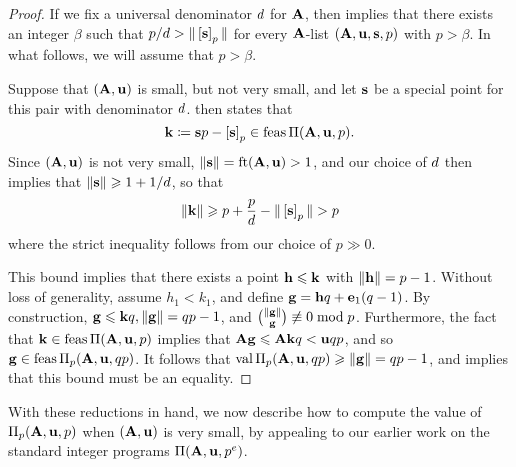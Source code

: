 \documentclass{amsart}
\begin{document}
\begin{proof}
   If we fix a universal denominator $d$ for $\mathbf{A}$, then  implies that there exists an integer $\beta$ such that $p/d > \| \left[ \mathbf{s} \right]_p \|$ for every $\mathbf{A}$-list $(\mathbf{A},\mathbf{u},\mathbf{s}, p)$ with $p > \beta$.
   In what follows, we will assume that $p > \beta$.

   Suppose that $(\mathbf{A},\mathbf{u})$ is small, but not very small, and let $\mathbf{s}$ be a special point for this pair with denominator $d$.
    then states that
   \[ \mathbf{k} \coloneqq \mathbf{s}p-\left[ \mathbf{s} \right]_p \in \operatorname{feas} \Pi(\mathbf{A},\mathbf{u},p). \]
   Since $(\mathbf{A},\mathbf{u})$ is not very small, $\| \mathbf{s} \| = \operatorname{ft}(\mathbf{A}, \mathbf{u}) > 1$, and our choice of $d$ then implies that $\| \mathbf{s} \| \geqslant 1 + 1/d$, so that
   \[\| \mathbf{k} \| \geqslant p + \frac{p}{d} - \| \left[ \mathbf{s} \right]_p \| > p\]
   where the strict inequality follows from our choice of $p \gg 0$.

   This bound implies that there exists a point $\mathbf{h} \leqslant \mathbf{k}$ with $\| \mathbf{h} \| = p-1$.
   Without loss of generality, assume $h_1 < k_1$, and define $\mathbf{g} = \mathbf{h}q + \mathbf{e}_1(q-1)$.
   By construction, $\mathbf{g} \leqslant \mathbf{k}q, \| \mathbf{g} \| = qp-1$, and $\binom{\| \mathbf{g} \|}{\mathbf{g}} \not\equiv 0 \bmod p$.
   Furthermore, the fact that $\mathbf{k} \in \operatorname{feas} \Pi(\mathbf{A},\mathbf{u},p)$ implies that $\mathbf{A}\mathbf{g} \leqslant \mathbf{A}{\mathbf{k}}q < \mathbf{u}qp$, and so $\mathbf{g} \in \operatorname{feas} \Pi_p(\mathbf{A},\mathbf{u},qp)$.
   It follows that $\operatorname{val} \Pi_p(\mathbf{A},\mathbf{u},qp) \geqslant \| \mathbf{g} \| = qp-1$, and  implies that this bound must be an equality.
\end{proof}

With these reductions in hand, we now describe how to compute the value of $\Pi_p(\mathbf{A}, \mathbf{u}, p)$ when $(\mathbf{A}, \mathbf{u})$ is very small,  by appealing to our earlier work on the standard integer programs $\Pi(\mathbf{A}, \mathbf{u}, p^e)$.
\end{document}
